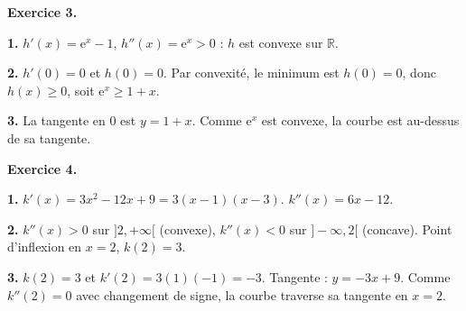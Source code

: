 \textbf{Exercice 3.}

\textbf{1.} $h'(x) = \mathrm{e}^x - 1$, $h''(x) = \mathrm{e}^x > 0$ : $h$ est convexe sur $\mathbb{R}$.

\textbf{2.} $h'(0) = 0$ et $h(0) = 0$. Par convexité, le minimum est $h(0) = 0$, donc $h(x) \geq 0$, soit $\mathrm{e}^x \geq 1 + x$.

\textbf{3.} La tangente en $0$ est $y = 1 + x$. Comme $\mathrm{e}^x$ est convexe, la courbe est au-dessus de sa tangente.

\bigskip

\textbf{Exercice 4.}

\textbf{1.} $k'(x) = 3x^2 - 12x + 9 = 3(x-1)(x-3)$. $k''(x) = 6x - 12$.

\textbf{2.} $k''(x) > 0$ sur $]2, +\infty[$ (convexe), $k''(x) < 0$ sur $]-\infty, 2[$ (concave). Point d'inflexion en $x = 2$, $k(2) = 3$.

\textbf{3.} $k(2) = 3$ et $k'(2) = 3(1)(-1) = -3$. Tangente : $y = -3x + 9$. Comme $k''(2) = 0$ avec changement de signe, la courbe traverse sa tangente en $x = 2$.

